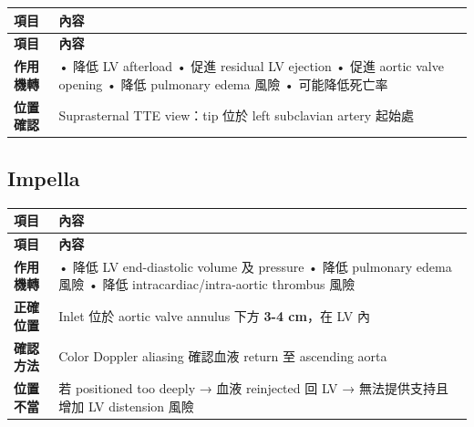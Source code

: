 \documentclass[12pt,a4paper]{article}
\begin{document}
\begin{longtable}{p{4cm}p{10cm}}
\toprule
\textbf{項目} & \textbf{內容} \\
\midrule
\endfirsthead

\toprule
\textbf{項目} & \textbf{內容} \\
\midrule
\endhead

\bottomrule
\endfoot

\textbf{作用機轉} &
• 降低 LV afterload\newline
• 促進 residual LV ejection\newline
• 促進 aortic valve opening\newline
• 降低 pulmonary edema 風險\newline
• 可能降低死亡率 \\
\midrule
\textbf{位置確認} & Suprasternal TTE view：tip 位於 left subclavian artery 起始處 \\
\bottomrule
\end{longtable}

\subsection{Impella}

\begin{longtable}{p{4cm}p{10cm}}
\toprule
\textbf{項目} & \textbf{內容} \\
\midrule
\endfirsthead

\toprule
\textbf{項目} & \textbf{內容} \\
\midrule
\endhead

\bottomrule
\endfoot

\textbf{作用機轉} &
• 降低 LV end-diastolic volume 及 pressure\newline
• 降低 pulmonary edema 風險\newline
• 降低 intracardiac/intra-aortic thrombus 風險 \\
\midrule
\textbf{正確位置} & Inlet 位於 aortic valve annulus 下方 \textbf{3-4 cm}，在 LV 內 \\
\midrule
\textbf{確認方法} & Color Doppler aliasing 確認血液 return 至 ascending aorta \\
\midrule
\textbf{位置不當} & 若 positioned too deeply → 血液 reinjected 回 LV\newline
→ 無法提供支持且增加 LV distension 風險 \\
\bottomrule
\end{longtable}

\end{document}
